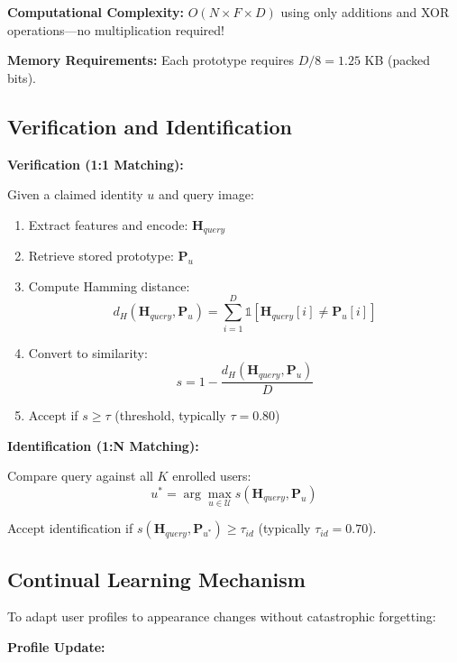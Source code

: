 \documentclass[a4paper,12pt]{article}
\begin{document}
\textbf{Computational Complexity:} $O(N \times F \times D)$ using only additions and XOR operations—no multiplication required!

\textbf{Memory Requirements:} Each prototype requires $D / 8 = 1.25$ KB (packed bits).

\subsection{Verification and Identification}

\textbf{Verification (1:1 Matching):}

Given a claimed identity $u$ and query image:

\begin{enumerate}
    \item Extract features and encode: $\mathbf{H}_{query}$
    \item Retrieve stored prototype: $\mathbf{P}_u$
    \item Compute Hamming distance:
    \begin{equation}
    d_H(\mathbf{H}_{query}, \mathbf{P}_u) = \sum_{i=1}^D \mathbb{1}[\mathbf{H}_{query}[i] \neq \mathbf{P}_u[i]]
    \end{equation}
    \item Convert to similarity:
    \begin{equation}
    s = 1 - \frac{d_H(\mathbf{H}_{query}, \mathbf{P}_u)}{D}
    \end{equation}
    \item Accept if $s \geq \tau$ (threshold, typically $\tau = 0.80$)
\end{enumerate}

\textbf{Identification (1:N Matching):}

Compare query against all $K$ enrolled users:
\begin{equation}
u^* = \arg\max_{u \in \mathcal{U}} s(\mathbf{H}_{query}, \mathbf{P}_u)
\end{equation}

Accept identification if $s(\mathbf{H}_{query}, \mathbf{P}_{u^*}) \geq \tau_{id}$ (typically $\tau_{id} = 0.70$).

\subsection{Continual Learning Mechanism}

To adapt user profiles to appearance changes without catastrophic forgetting:

\textbf{Profile Update:}
\end{document}
